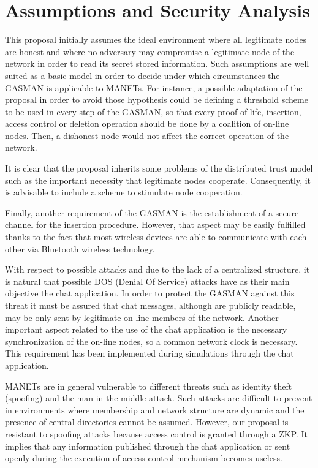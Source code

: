 \documentclass[conference]{IEEEtran}
\begin{document}
\section{Assumptions and Security Analysis}
\label{AssumptionsasnSecurity}
This proposal initially assumes the ideal environment where all
legitimate nodes are honest and where no adversary may compromise
a legitimate node of the network in order to read its secret
stored information. Such assumptions are well suited as a basic
model in order to decide under which circumstances the GASMAN is applicable to MANETs. For instance, a possible adaptation of the proposal in order to avoid those
hypothesis could be defining a threshold scheme to be used in every step of the GASMAN, so that every proof of life, insertion, access control or deletion operation should be done by a coalition of on-line nodes. Then, a dishonest node would not affect
the correct operation of the network.

It is clear that the proposal inherits some problems of the distributed trust model such as the important necessity that legitimate nodes cooperate. Consequently, it is advisable to include a scheme to stimulate node cooperation.

Finally, another requirement of the GASMAN is the establishment of a secure channel for the insertion procedure. However, that aspect may be easily fulfilled thanks to the fact
that most wireless devices are able to communicate with each other via Bluetooth wireless technology.

With respect to possible attacks and due to the lack of a centralized
structure, it is natural that possible DOS (Denial Of Service)
attacks have as their main objective the chat application. In
order to protect the GASMAN against this threat it must be assured
that chat messages, although are publicly readable, may be only
sent by legitimate on-line members of the network. Another
important aspect related to the use of the chat application is the
necessary synchronization of the on-line nodes, so a common
network clock is necessary.  This requirement has been implemented
during simulations through the chat application.

MANETs are in general vulnerable to different threats such as
identity theft (spoofing) and the man-in-the-middle attack. Such
attacks are difficult to prevent in environments where membership
and network structure are dynamic and the presence of central
directories cannot be assumed. However, our proposal is resistant
to spoofing attacks because access control is granted through a ZKP. It implies
that any information published through the chat application or sent openly during the execution of access control mechanism becomes useless.
\end{document}
